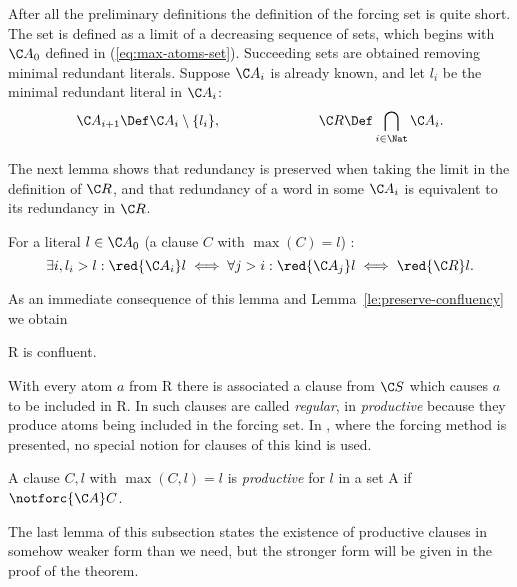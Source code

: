 After all the preliminary definitions the definition of the forcing set is quite
short. The set is defined as a limit of a decreasing sequence of sets, which 
begins with $\C A_0$ defined in (\ref{eq:max-atoms-set}). Succeeding sets are 
obtained removing minimal redundant literals. Suppose $\C A_i$ is already 
known, and let \(l_i\) be the minimal redundant literal in \(\C A_i\):
\begin{equation} \label{eq:atoms-model}
\C A_{i+1} \Def \C A_i \setminus \{l_i\}, \hspace{7em}
\C R \Def \bigcap_{i\in \Nat} \C A_i.
\end{equation}

The next lemma shows that redundancy
is preserved when taking the limit in the definition of $\C R$,
and that redundancy of a word in some \(\C A_i\) is equivalent
to its redundancy in $\C R$.
\begin{LEMMA} \label{le:redundancy-limit}
For a literal $l\in\C A_0$ (a clause $C$ with \(\max(C)=l\)) : 
\[ \exists i, l_i>l : \red{\C A_i}l \iff
 \forall j>i: \red{\C A_j}l \iff \red{\C R}l .\]
\end{LEMMA}
As an immediate consequence of this lemma
and Lemma~\ref {le:preserve-confluency}
we obtain
\begin{COROLLARY} \label{co:model-confluent}
\C R is confluent.
\end{COROLLARY}


With every atom $a$ from \C R there is associated a clause from $\C S$ which
causes $a$ to be included in \C R. In \cite{S-A} such clauses are called {\em
regular}, in \cite{BG} {\em productive} because they produce atoms being
included in the forcing set. In \cite{PP}, where the forcing method is presented,
no special notion for clauses of this kind is used.
\begin{DEFINITION} \label{def:productive}
A clause $C,l$ with $\max(C,l)=l$ is {\em productive} for $l$ in a set \C A 
if $\notforc{\C A}C$.
\end{DEFINITION}
The last lemma of this subsection 
states the existence of productive clauses in somehow weaker form than
we need, but the stronger form will be given in the proof of the theorem.

